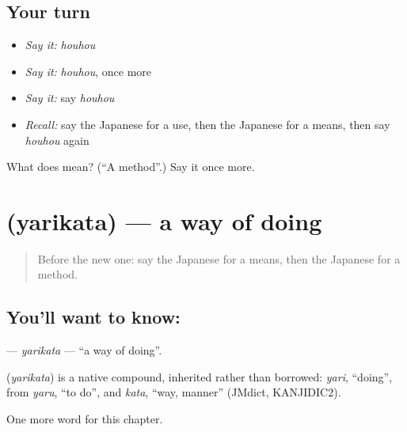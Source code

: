 \subsection*{Your turn}
\begin{itemize}
\raggedright
  \item \emph{Say it:} \emph{houhou}
  \item \emph{Say it:} \emph{houhou}, once more
  \item \emph{Say it:} say \emph{houhou}
  \item \emph{Recall:} say the Japanese for a use, then the Japanese for a means, then say \emph{houhou} again
\end{itemize}

\begin{tcolorbox}[breakable,colback=teal!4,colframe=teal!35!black,title={Before you move on}]
What does  mean? (\textquotedblleft{}A method\textquotedblright{}.) Say it once more.
\end{tcolorbox}
\section[\texorpdfstring{\ja{やりかた} (yarikata)}{やりかた (yarikata)}]{ (yarikata) — a way of doing}

\label{lesson:JA-C97-yarikata}



\begin{quote}
Before the new one: say the Japanese for a means, then the Japanese for a method.
\end{quote}

\subsection*{You'll want to know: }
\textbf{} — \emph{yarikata} — \textquotedblleft{}a way of doing\textquotedblright{}.

\begin{cousinweb}
\textbf{} (\emph{yarikata}) is a native compound, inherited rather than borrowed: \emph{yari}, \textquotedblleft{}doing\textquotedblright{}, from \emph{yaru}, \textquotedblleft{}to do\textquotedblright{}, and \emph{kata}, \textquotedblleft{}way, manner\textquotedblright{} (JMdict, KANJIDIC2).
\end{cousinweb}

\begin{grammarlens}[title={What you've built}]
One more word for this chapter.
\end{grammarlens}

